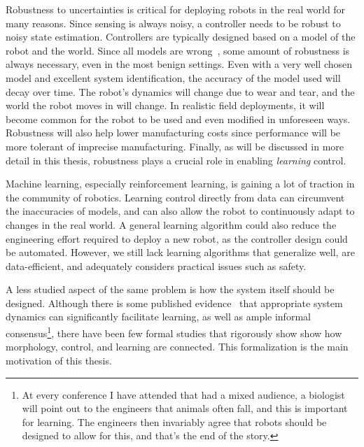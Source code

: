 Robustness to uncertainties is critical for deploying robots in the real world for many reasons.
Since sensing is always noisy, a controller needs to be robust to noisy state estimation.
Controllers are typically designed based on a model of the robot and the world. Since all models are wrong~\cite{box1976science}, some amount of robustness is always necessary, even in the most benign settings.
Even with a very well chosen model and excellent system identification, the accuracy of the model used will decay over time.
The robot's dynamics will change due to wear and tear, and the world the robot moves in will change.
In realistic field deployments, it will become common for the robot to be used and even modified in unforeseen ways.
Robustness will also help lower manufacturing costs since performance will be more tolerant of imprecise manufacturing.
Finally, as will be discussed in more detail in this thesis, robustness plays a crucial role in enabling \emph{learning} control.
\par
Machine learning, especially reinforcement learning, is gaining a lot of traction in the community of robotics. Learning control directly from data can circumvent the inaccuracies of models, and can also allow the robot to continuously adapt to changes in the real world.
A general learning algorithm could also reduce the engineering effort required to deploy a new robot, as the controller design could be automated.
However, we still lack learning algorithms that generalize well, are data-efficient, and adequately considers practical issues such as safety. \par
A less studied aspect of the same problem is how the system itself should be designed. Although there is some published evidence~\cite{tedrake2005learning, randlov2000shaping} that appropriate system dynamics can significantly facilitate learning, as well as ample informal consensus\footnote{At every conference I have attended that had a mixed audience, a biologist will point out to the engineers that animals often fall, and this is important for learning. The engineers then invariably agree that robots should be designed to allow for this, and that's the end of the story.}, there have been few formal studies that rigorously show show how morphology, control, and learning are connected. This formalization is the main motivation of this thesis.

